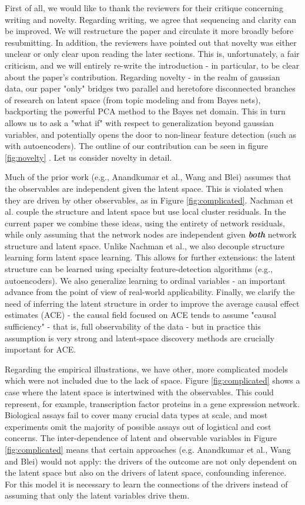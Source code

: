 \documentclass{article}
\begin{document}
First of all, we would like to thank the reviewers for their critique concerning writing and novelty.  Regarding writing, we agree that sequencing and clarity can be improved.  We will restructure the paper and circulate it more broadly before resubmitting.  In addition, the reviewers have pointed out that novelty was either unclear or only clear upon reading the later sections.  This is, unfortunately, a fair criticism, and we will entirely re-write the introduction - in particular, to be clear about the paper's contribution.  Regarding novelty - in the realm of gaussian data, our paper "only" bridges two parallel and heretofore disconnected branches of research on latent space (from topic modeling and from Bayes nets), backporting the powerful PCA method to the Bayes net domain.  This in turn allows us to ask a "what if" with respect to generalization beyond gaussian variables, and potentially opens the door to non-linear feature detection (such as with autoencoders).  The outline of our contribution can be seen in figure \ref{fig:novelty} .  Let us consider novelty in detail.

Much of the prior work (e.g., Anandkumar et al., Wang and Blei) assumes that the observables are independent given the latent space. This is violated when they are driven by other observables, as in Figure \ref{fig:complicated}.  Nachman et al. couple the structure and latent space but use local cluster residuals.  In the current paper we combine these ideas, using the entirety of network residuals, while only assuming that the network nodes are independent given \textbf{\textit{both}} network structure and latent space.  Unlike Nachman et al., we also decouple structure learning form latent space learning.  This allows for further extensions: the latent structure can be learned using specialty feature-detection algorithms (e.g., autoencoders).  We also generalize learning to ordinal variables - an important advance from the point of view of real-world applicability.  Finally, we clarify the need of inferring the latent structure in order to improve the average causal effect estimates (ACE) - the causal field focused on ACE tends to assume "causal sufficiency" - that is, full observability of the data - but in practice this assumption is very strong and latent-space discovery methods are crucially important for ACE.

Regarding the empirical illustrations, we have other, more complicated models which were not included due to the lack of space. Figure \ref{fig:complicated} shows a case where the latent space is intertwined with the observables.  This could represent, for example, transcription factor proteins in a gene expression network.  Biological assays fail to cover many crucial data types at scale, and most experiments omit the majority of possible assays out of logistical and cost concerns.  The inter-dependence of latent and observable variables in Figure \ref{fig:complicated} means that certain approaches (e.g. Anandkumar et al., Wang and Blei) would not apply: the drivers of the outcome are not only dependent on the latent space but also on the drivers of latent space, confounding inference. For this model it is necessary to learn the connections of the drivers instead of assuming that only the latent variables drive them.
\end{document}
